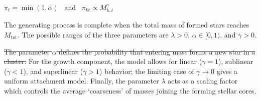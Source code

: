 \documentclass[ejs]{imsart}
\numberwithin{equation}{section}
\theoremstyle{plain}
\newcommand{\remove}[1]{\st{#1}}
\newcommand{\Mtot}{M_{\text{tot}}}
\begin{document}
\remove{$\pi_t = \min \left (1, \alpha \right ) \;\;\; \text{and} \;\;\; \pi_{kt} \propto M_{k,t}^{\gamma}$}

The generating process is complete when the total mass of formed stars reaches $\Mtot$. 
The possible ranges of the three parameters are $\lambda > 0$, $\alpha \in [0,1)$, and $\gamma > 0$. 

\remove{The parameter $\alpha$ defines the probability that entering mass forms a new star in a cluster.}  For the growth component, the model allows for linear ($\gamma = 1$), sublinear ($\gamma < 1$), and superlinear ($\gamma > 1$) behavior; the limiting case of $\gamma \to 0$ gives a uniform attachment model.  Finally, the parameter $\lambda$ acts as a scaling factor which controls the average `coarseness' of masses joining the forming stellar cores. 
\end{document}
